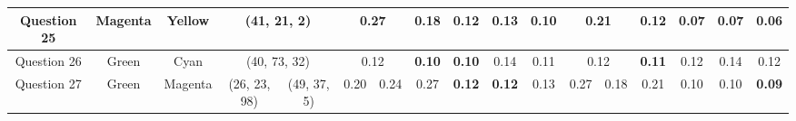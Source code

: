 \begin{table}[!htbp]
{\begin{tabular}{@{}cccccclccccclcccc@{}}
    \multicolumn{1}{c|}{Question 25} & \multicolumn{1}{c|}{Magenta} & \multicolumn{1}{c|}{Yellow}  & \multicolumn{2}{c||}{\cellcolor[HTML]{FF0000}(41, 21, 2)}                                                              & \multicolumn{2}{c|}{0.27}                                  & \multicolumn{1}{c|}{0.18}                                  & \multicolumn{1}{c|}{0.12}                                  & \multicolumn{1}{c|}{0.13}                                  & \multicolumn{1}{c||}{\cellcolor[HTML]{32CB00}\textbf{0.10}} & \multicolumn{2}{c|}{0.21}                                  & \multicolumn{1}{c|}{0.12}                                  & \multicolumn{1}{c|}{0.07}                                  & \multicolumn{1}{c|}{0.07}                                  & \multicolumn{1}{c|}{\cellcolor[HTML]{32CB00}\textbf{0.06}} \\ \midrule
    \multicolumn{1}{c|}{Question 26} & \multicolumn{1}{c|}{Green}   & \multicolumn{1}{c|}{Cyan}    & \multicolumn{2}{c||}{\cellcolor[HTML]{00FF80}(40, 73, 32)}                                                             & \multicolumn{2}{c|}{0.12}                                  & \multicolumn{1}{c|}{\cellcolor[HTML]{32CB00}\textbf{0.10}} & \multicolumn{1}{c|}{\cellcolor[HTML]{32CB00}\textbf{0.10}} & \multicolumn{1}{c|}{0.14}                                  & \multicolumn{1}{c||}{0.11}                                  & \multicolumn{2}{c|}{0.12}                                  & \multicolumn{1}{c|}{\cellcolor[HTML]{32CB00}\textbf{0.11}} & \multicolumn{1}{c|}{0.12}                                  & \multicolumn{1}{c|}{0.14}                                  & \multicolumn{1}{c|}{0.12}                                  \\ \midrule
    \multicolumn{1}{c|}{Question 27} & \multicolumn{1}{c|}{Green}   & \multicolumn{1}{c|}{Magenta} & \multicolumn{1}{c||}{\cellcolor[HTML]{0080FF}(26, 23, 98)} & \multicolumn{1}{c||}{\cellcolor[HTML]{FF8000}(49, 37, 5)}  & \multicolumn{1}{c|}{0.20}    & \multicolumn{1}{l|}{0.24}   & \multicolumn{1}{c|}{0.27}                                  & \multicolumn{1}{c|}{\cellcolor[HTML]{32CB00}\textbf{0.12}} & \multicolumn{1}{c|}{\cellcolor[HTML]{32CB00}\textbf{0.12}} & \multicolumn{1}{c||}{0.13}                                  & \multicolumn{1}{c|}{0.27}    & \multicolumn{1}{l|}{0.18}   & \multicolumn{1}{c|}{0.21}                                  & \multicolumn{1}{c|}{0.10}                                  & \multicolumn{1}{c|}{0.10}                                  & \multicolumn{1}{c|}{\cellcolor[HTML]{32CB00}\textbf{0.09}} \\ \midrule

\end{tabular}}
\end{table}
